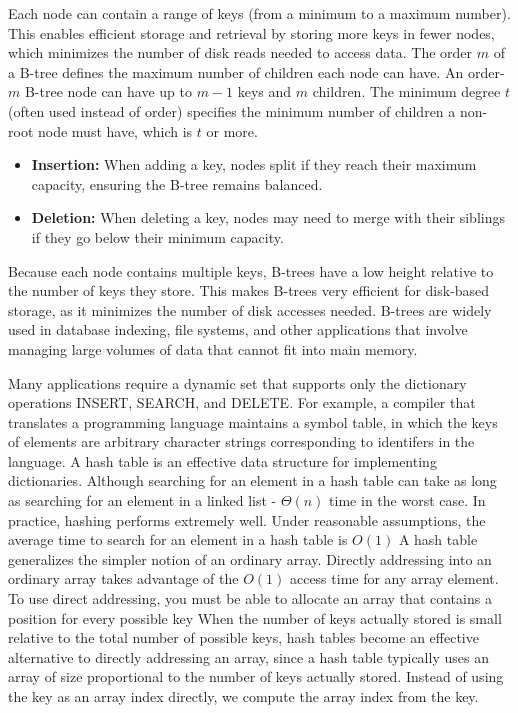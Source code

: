 \documentclass{report}
\begin{document}
 \bigbreak \noindent 
 Each node can contain a range of keys (from a minimum to a maximum number). This enables efficient storage and retrieval by storing more keys in fewer nodes, which minimizes the number of disk reads needed to access data.
 \bigbreak \noindent 
 The order $m$ of a B-tree defines the maximum number of children each node can have. An order-$m$ B-tree node can have up to $m-1$ keys and $m$ children.
 \bigbreak \noindent 
 The minimum degree $t$ (often used instead of order) specifies the minimum number of children a non-root node must have, which is $t$ or more.
 \begin{itemize}
     \item \textbf{Insertion:} When adding a key, nodes split if they reach their maximum capacity, ensuring the B-tree remains balanced.
     \item \textbf{Deletion:} When deleting a key, nodes may need to merge with their siblings if they go below their minimum capacity.
 \end{itemize}
 \bigbreak \noindent 
  Because each node contains multiple keys, B-trees have a low height relative to the number of keys they store. This makes B-trees very efficient for disk-based storage, as it minimizes the number of disk accesses needed.
  \bigbreak \noindent 
  B-trees are widely used in database indexing, file systems, and other applications that involve managing large volumes of data that cannot fit into main memory.

  \pagebreak 
  \bigbreak \noindent 
  Many applications require a dynamic set that supports only the dictionary operations INSERT, SEARCH, and DELETE. For example, a compiler that translates a
programming language maintains a symbol table, in which the keys of elements
are arbitrary character strings corresponding to identifers in the language. A hash
table is an effective data structure for implementing dictionaries. Although searching for an element in a hash table can take as long as searching for an element in a
linked list - $\Theta(n)$ time in the worst case. In practice, hashing performs extremely
well. Under reasonable assumptions, the average time to search for an element in
a hash table is $O(1)$
\bigbreak \noindent 
A hash table generalizes the simpler notion of an ordinary array. Directly addressing into an ordinary array takes advantage of the $O(1)$ access time for any array element.
\bigbreak \noindent 
To use direct addressing, you must be able to allocate an array that contains a position for every possible key
\bigbreak \noindent 
When the number of keys actually stored is small relative to the total number of possible keys, hash tables become an effective alternative to directly addressing an array, since a hash table typically uses an array of size proportional to the number of keys actually stored. Instead of using the key as an array index directly, we compute the array index from the key.
\end{document}
